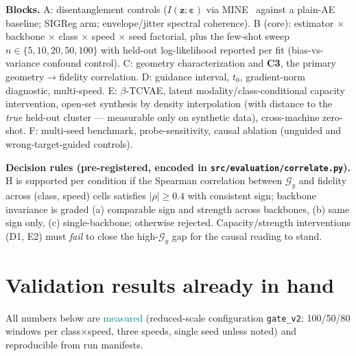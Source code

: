 \documentclass[11pt]{article}
\newcommand{\z}{\mathbf{z}}
\newcommand{\Gng}{\mathcal{G}}
\newcommand{\measured}[1]{\textcolor{teal}{#1}}
\newcommand{\code}[1]{\texttt{\small #1}}
\begin{document}
\textbf{Blocks.} A: disentanglement controls ($I(\z;\boldsymbol{\varepsilon})$
via MINE~\cite{belghazi2018mine} against a plain-AE baseline; SIGReg arm;
envelope/jitter spectral coherence). B (core): estimator $\times$ backbone
$\times$ class $\times$ speed $\times$ seed factorial, plus the few-shot
sweep $n\in\{5,10,20,50,100\}$ with held-out log-likelihood reported per fit
(bias-vs-variance confound control). C: geometry characterization and
\textbf{C3}, the primary geometry$\to$fidelity correlation. D: guidance
interval, $t_0$, gradient-norm diagnostic, multi-speed. E: $\beta$-TCVAE,
latent modality/class-conditional capacity intervention, open-set synthesis
by density interpolation (with distance to the \emph{true} held-out cluster
--- measurable only on synthetic data), cross-machine zero-shot. F:
multi-seed benchmark, probe-sensitivity, causal ablation (unguided and
wrong-target-guided controls).

\textbf{Decision rules (pre-registered, encoded in
\code{src/evaluation/correlate.py}).} H is supported per condition if the
Spearman correlation between $\Gng_y$ and fidelity across (class, speed)
cells satisfies $|\rho|\ge 0.4$ with consistent sign; backbone invariance is
graded (a) comparable sign and strength across backbones, (b) same sign only,
(c) single-backbone; otherwise rejected. Capacity/strength interventions
(D1, E2) must \emph{fail} to close the high-$\Gng_y$ gap for the causal
reading to stand.

\section{Validation results already in hand}
\label{sec:validated}

All numbers below are \measured{measured} (reduced-scale configuration
\code{gate\_v2}: 100/50/80 windows per class$\times$speed, three speeds,
single seed unless noted) and reproducible from run manifests.
\end{document}
